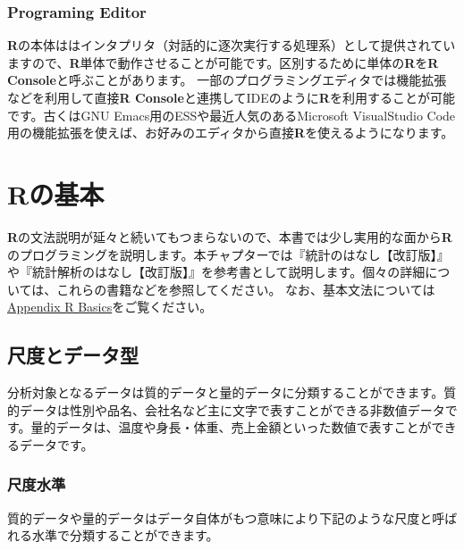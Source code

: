 \documentclass[
  12pt,
]{book}
\begin{document}
\hypertarget{programing-editor}{%
\subsection{Programing Editor}\label{programing-editor}}

\textbf{R}の本体ははインタプリタ（対話的に逐次実行する処理系）として提供されていますので、\textbf{R}単体で動作させることが可能です。区別するために単体の\textbf{R}を\textbf{R Console}と呼ぶことがあります。 一部のプログラミングエディタでは機能拡張などを利用して直接\textbf{R Console}と連携してIDEのように\textbf{R}を利用することが可能です。古くはGNU Emacs用のESSや最近人気のあるMicrosoft VisualStudio Code用の機能拡張を使えば、お好みのエディタから直接\textbf{R}を使えるようになります。

\hypertarget{rux306eux57faux672c}{%
\chapter{Rの基本}\label{rux306eux57faux672c}}

\textbf{R}の文法説明が延々と続いてもつまらないので、本書では少し実用的な面から\textbf{R}のプログラミングを説明します。本チャプターでは『統計のはなし【改訂版】』\citep{ToukeinoHanashi}や『統計解析のはなし【改訂版】』\citep{ToukeiKaisekinoHanashi}を参考書として説明します。個々の詳細については、これらの書籍などを参照してください。 なお、基本文法については\protect\hyperlink{Appendix-RBasics}{Appendix R Basics}をご覧ください。

\hypertarget{ux5c3aux5ea6ux3068ux30c7ux30fcux30bfux578b}{%
\section{尺度とデータ型}\label{ux5c3aux5ea6ux3068ux30c7ux30fcux30bfux578b}}

分析対象となるデータは質的データと量的データに分類することができます。質的データは性別や品名、会社名など主に文字で表すことができる非数値データです。量的データは、温度や身長・体重、売上金額といった数値で表すことができるデータです。

\hypertarget{ux5c3aux5ea6ux6c34ux6e96}{%
\subsection{尺度水準}\label{ux5c3aux5ea6ux6c34ux6e96}}

質的データや量的データはデータ自体がもつ意味により下記のような尺度と呼ばれる水準で分類することができます。
\end{document}
